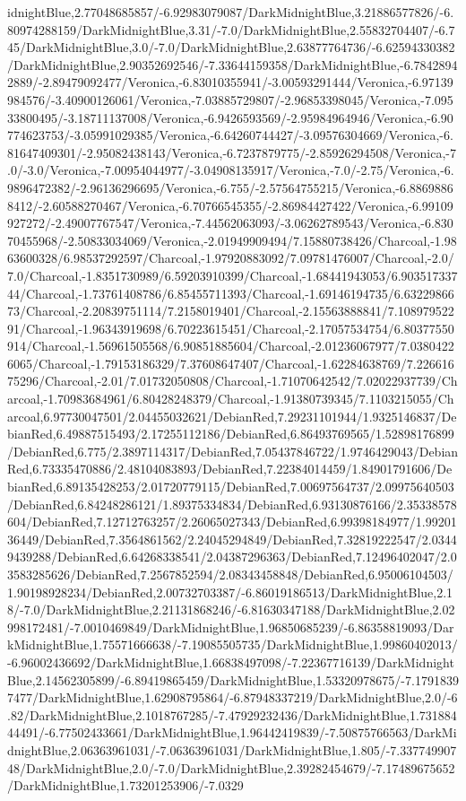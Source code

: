 {\begin{tikzternal}
idnightBlue,2.77048685857/-6.92983079087/DarkMidnightBlue,3.21886577826/-6.80974288159/DarkMidnightBlue,3.31/-7.0/DarkMidnightBlue,2.55832704407/-6.745/DarkMidnightBlue,3.0/-7.0/DarkMidnightBlue,2.63877764736/-6.62594330382/DarkMidnightBlue,2.90352692546/-7.33644159358/DarkMidnightBlue,-6.78428942889/-2.89479092477/Veronica,-6.83010355941/-3.00593291444/Veronica,-6.97139984576/-3.40900126061/Veronica,-7.03885729807/-2.96853398045/Veronica,-7.09533800495/-3.18711137008/Veronica,-6.9426593569/-2.95984964946/Veronica,-6.90774623753/-3.05991029385/Veronica,-6.64260744427/-3.09576304669/Veronica,-6.81647409301/-2.95082438143/Veronica,-6.7237879775/-2.85926294508/Veronica,-7.0/-3.0/Veronica,-7.00954044977/-3.04908135917/Veronica,-7.0/-2.75/Veronica,-6.9896472382/-2.96136296695/Veronica,-6.755/-2.57564755215/Veronica,-6.88698868412/-2.60588270467/Veronica,-6.70766545355/-2.86984427422/Veronica,-6.99109927272/-2.49007767547/Veronica,-7.44562063093/-3.06262789543/Veronica,-6.83070455968/-2.50833034069/Veronica,-2.01949909494/7.15880738426/Charcoal,-1.9863600328/6.98537292597/Charcoal,-1.97920883092/7.09781476007/Charcoal,-2.0/7.0/Charcoal,-1.8351730989/6.59203910399/Charcoal,-1.68441943053/6.90351733744/Charcoal,-1.73761408786/6.85455711393/Charcoal,-1.69146194735/6.6322986673/Charcoal,-2.20839751114/7.2158019401/Charcoal,-2.15563888841/7.10897952291/Charcoal,-1.96343919698/6.70223615451/Charcoal,-2.17057534754/6.80377550914/Charcoal,-1.56961505568/6.90851885604/Charcoal,-2.01236067977/7.03804226065/Charcoal,-1.79153186329/7.37608647407/Charcoal,-1.62284638769/7.22661675296/Charcoal,-2.01/7.01732050808/Charcoal,-1.71070642542/7.02022937739/Charcoal,-1.70983684961/6.80428248379/Charcoal,-1.91380739345/7.1103215055/Charcoal,6.97730047501/2.04455032621/DebianRed,7.29231101944/1.9325146837/DebianRed,6.49887515493/2.17255112186/DebianRed,6.86493769565/1.52898176899/DebianRed,6.775/2.3897114317/DebianRed,7.05437846722/1.9746429043/DebianRed,6.73335470886/2.48104083893/DebianRed,7.22384014459/1.84901791606/DebianRed,6.89135428253/2.01720779115/DebianRed,7.00697564737/2.09975640503/DebianRed,6.84248286121/1.89375334834/DebianRed,6.93130876166/2.35338578604/DebianRed,7.12712763257/2.26065027343/DebianRed,6.99398184977/1.9920136449/DebianRed,7.3564861562/2.24045294849/DebianRed,7.32819222547/2.03449439288/DebianRed,6.64268338541/2.04387296363/DebianRed,7.12496402047/2.03583285626/DebianRed,7.2567852594/2.08343458848/DebianRed,6.95006104503/1.90198928234/DebianRed,2.00732703387/-6.86019186513/DarkMidnightBlue,2.18/-7.0/DarkMidnightBlue,2.21131868246/-6.81630347188/DarkMidnightBlue,2.02998172481/-7.0010469849/DarkMidnightBlue,1.96850685239/-6.86358819093/DarkMidnightBlue,1.75571666638/-7.19085505735/DarkMidnightBlue,1.99860402013/-6.96002436692/DarkMidnightBlue,1.66838497098/-7.22367716139/DarkMidnightBlue,2.14562305899/-6.89419865459/DarkMidnightBlue,1.53320978675/-7.17918397477/DarkMidnightBlue,1.62908795864/-6.87948337219/DarkMidnightBlue,2.0/-6.82/DarkMidnightBlue,2.1018767285/-7.47929232436/DarkMidnightBlue,1.73188444491/-6.77502433661/DarkMidnightBlue,1.96442419839/-7.50875766563/DarkMidnightBlue,2.06363961031/-7.06363961031/DarkMidnightBlue,1.805/-7.33774990748/DarkMidnightBlue,2.0/-7.0/DarkMidnightBlue,2.39282454679/-7.17489675652/DarkMidnightBlue,1.73201253906/-7.0329
\end{tikzternal}}
